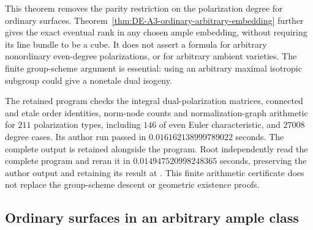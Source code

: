 \begin{remark}
\label{rem:DE-A3-ordinary-all-rank-scope}
This theorem removes the parity restriction on the polarization degree
for ordinary surfaces.  Theorem~\ref{thm:DE-A3-ordinary-arbitrary-embedding}
further gives the exact eventual rank in any chosen ample embedding,
without requiring its line bundle to be a cube.  It does not assert a formula for arbitrary
nonordinary even-degree polarizations, or for arbitrary ambient varieties.
The finite group-scheme argument is essential: using an arbitrary
maximal isotropic subgroup could give a nonetale dual isogeny.

The retained program
checks the integral dual-polarization matrices, connected and etale
order identities, norm-node counts and normalization-graph arithmetic
for $211$ polarization types, including $146$ of even Euler
characteristic, and $27008$ degree cases.  Its author run passed in
$0.016162138999789022$ seconds.  The complete output is retained
alongside the program.  Root independently read the complete program
and reran it in $0.014947520998248365$ seconds, preserving the author
output and retaining its result at
.
This finite arithmetic certificate does not
replace the group-scheme descent or geometric existence proofs.
\end{remark}


\subsection{Ordinary surfaces in an arbitrary ample class}
\label{sec:DE-A3-ordinary-arbitrary-embedding}

